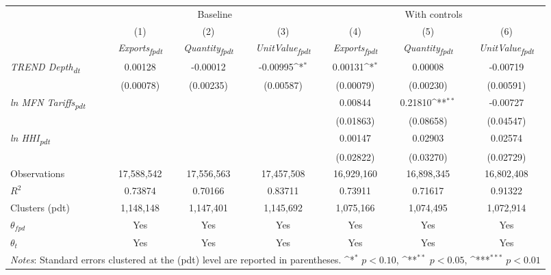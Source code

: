 {
\def\sym#1{\ifmmode^{#1}\else\(^{#1}\)\fi}
\begin{tabular}{l*{6}{c}}
\toprule
&\multicolumn{3}{c}{Baseline}&\multicolumn{3}{c}{With controls}\\\cmidrule(lr){2-4}\cmidrule(lr){5-7}
&(1)&(2)&(3)&(4)&(5)&(6)\\
&\textit{Exports\textsubscript{fpdt}}&\textit{Quantity\textsubscript{fpdt}}&\textit{UnitValue\textsubscript{fpdt}}&\textit{Exports\textsubscript{fpdt}}&\textit{Quantity\textsubscript{fpdt}}&\textit{UnitValue\textsubscript{fpdt}}\\
\midrule
\textit{TREND Depth\textsubscript{dt}} & 0.00128 & -0.00012 & -0.00995\sym{*} & 0.00131\sym{*} & 0.00008 & -0.00719\\
 & (0.00078) & (0.00235) & (0.00587) & (0.00079) & (0.00230) & (0.00591)\\
\addlinespace
\textit{ln MFN Tariffs\textsubscript{pdt}} &  &  &  & 0.00844 & 0.21810\sym{**} & -0.00727\\
 &  &  &  & (0.01863) & (0.08658) & (0.04547)\\
\addlinespace
\textit{ln HHI\textsubscript{pdt}} &  &  &  & 0.00147 & 0.02903 & 0.02574\\
 &  &  &  & (0.02822) & (0.03270) & (0.02729)\\
\midrule
Observations & 17,588,542 & 17,556,563 & 17,457,508 & 16,929,160 & 16,898,345 & 16,802,408\\
$R^{2}$ & 0.73874 & 0.70166 & 0.83711 & 0.73911 & 0.71617 & 0.91322\\
Clusters (pdt) & 1,148,148 & 1,147,401 & 1,145,692 & 1,075,166 & 1,074,495 & 1,072,914\\
$\theta_{fpd}$ & Yes & Yes & Yes & Yes & Yes & Yes\\
$\theta_{t}$ & Yes & Yes & Yes & Yes & Yes & Yes\\
\bottomrule
\multicolumn{7}{l}{\footnotesize \textit{Notes}: Standard errors clustered at the (pdt) level are reported in parentheses. \sym{*} \(p<0.10\), \sym{**} \(p<0.05\), \sym{***} \(p<0.01\)}\\
\end{tabular}
}
